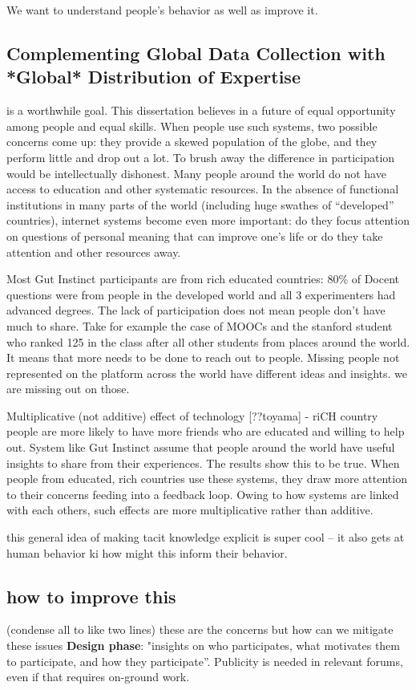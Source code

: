 We want to understand people's behavior as well as improve it. 

\subsection{Complementing Global Data Collection with *Global* Distribution of Expertise} is a worthwhile goal. This dissertation believes in a future of equal opportunity among people and equal skills. When people use such systems, two possible concerns come up: they provide a skewed population of the globe, and they perform little and drop out a lot.  To brush away the difference in participation would be intellectually dishonest. Many people around the world do not have access to education and other systematic resources. In the absence of functional institutions in many parts of the world (including huge swathes of “developed” countries), internet systems become even more important:  do they focus attention on questions of personal meaning that can improve one’s life or do they take attention and other resources away. 

Most Gut Instinct participants are from rich educated countries: 80\% of Docent questions were from people in the developed world and all 3 experimenters had advanced degrees. The lack of participation does not mean people don’t have much to share. Take for example the case of MOOCs and the stanford student who ranked 125 in the class after all other students from places around the world. It means that more needs to be done  to reach out to people.  Missing people not represented on the platform across the world have different ideas and insights. we are missing out on those. 

Multiplicative (not additive) effect of technology [??toyama] - riCH country people are more likely to have more friends who are educated and willing to help out. System like Gut Instinct assume that people around the world have useful insights to share from their experiences. The results show this to be true. When people from educated, rich countries use these systems, they draw more attention to their concerns feeding into a feedback loop. Owing to how systems are linked with each others, such effects are more multiplicative rather than additive. 

     this general idea of making tacit knowledge explicit is super cool -- it also gets at human behavior ki how might this inform their behavior.

\subsection{how to improve this}
(condense all to like two lines)
these are the concerns but how can we mitigate these issues
\textbf{Design phase}: "insights on who participates, what motivates them to participate, and how they participate”. Publicity is needed in relevant forums, even if that requires on-ground work.

